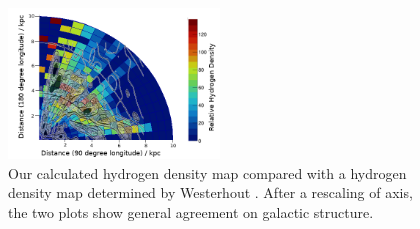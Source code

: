 \begin{figure}
  \includegraphics[width=0.5\textwidth]{final_wester}
  \caption{Our calculated hydrogen density map compared with a hydrogen density map determined by Westerhout \cite{westerhout}. After a rescaling of axis, the two plots show general agreement on galactic structure.}
  \label{comp}
\end{figure}


